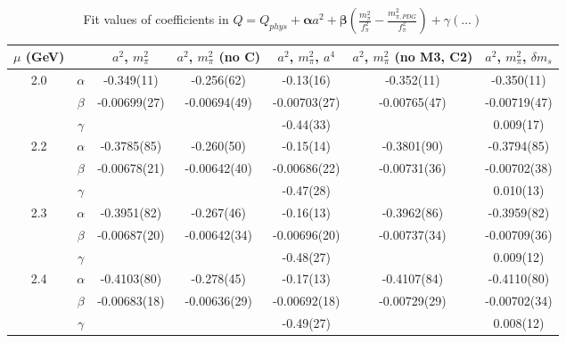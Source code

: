 \documentclass[12pt]{extarticle}
\begin{document}
\begin{table}[h!]
\begin{center}
\begin{tabular}{|c c|c|c|c|c|c|}
\hline
$\mu$ (GeV) &  & $a^2$, $m_\pi^2$& $a^2$, $m_\pi^2$ (no C)& $a^2$, $m_\pi^2$, $a^4$& $a^2$, $m_\pi^2$ (no M3, C2)& $a^2$, $m_\pi^2$, $\delta m_s$\\
\hline
\multirow{3}{0.5in}{2.0} & $\alpha$ & -0.349(11)& -0.256(62)& -0.13(16)& -0.352(11)& -0.350(11)\\
 & $\beta$ & -0.00699(27)& -0.00694(49)& -0.00703(27)& -0.00765(47)& -0.00719(47)\\
 & $\gamma$ &  &  & -0.44(33)&  & 0.009(17)\\
\hline
\multirow{3}{0.5in}{2.2} & $\alpha$ & -0.3785(85)& -0.260(50)& -0.15(14)& -0.3801(90)& -0.3794(85)\\
 & $\beta$ & -0.00678(21)& -0.00642(40)& -0.00686(22)& -0.00731(36)& -0.00702(38)\\
 & $\gamma$ &  &  & -0.47(28)&  & 0.010(13)\\
\hline
\multirow{3}{0.5in}{2.3} & $\alpha$ & -0.3951(82)& -0.267(46)& -0.16(13)& -0.3962(86)& -0.3959(82)\\
 & $\beta$ & -0.00687(20)& -0.00642(34)& -0.00696(20)& -0.00737(34)& -0.00709(36)\\
 & $\gamma$ &  &  & -0.48(27)&  & 0.009(12)\\
\hline
\multirow{3}{0.5in}{2.4} & $\alpha$ & -0.4103(80)& -0.278(45)& -0.17(13)& -0.4107(84)& -0.4110(80)\\
 & $\beta$ & -0.00683(18)& -0.00636(29)& -0.00692(18)& -0.00729(29)& -0.00702(34)\\
 & $\gamma$ &  &  & -0.49(27)&  & 0.008(12)\\
\hline
\end{tabular}
\caption{Fit values of coefficients in $Q = Q_{phys} + \mathbf{\alpha} a^2 + \mathbf{\beta}\left(\frac{m_\pi^2}{f_\pi^2}-\frac{m_{\pi,PDG}^2}{f_\pi^2}\right) + \gamma(\ldots)$}
\end{center}
\end{table}




















\clearpage
\end{document}
